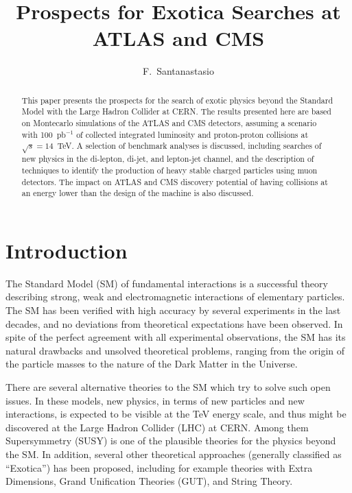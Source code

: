 \documentclass{cimento}
\title{Prospects for Exotica Searches at ATLAS and CMS}
\author{F.~Santanastasio\from{ins:UMD}\ETC
}
\begin{document}
\maketitle

\begin{abstract}
This paper presents the prospects for the search of exotic physics 
beyond the Standard Model with the Large Hadron Collider at CERN. 
The results presented here are based on Montecarlo simulations of the
ATLAS and CMS detectors, assuming a scenario with 
100~pb$^{-1}$ of collected integrated luminosity and proton-proton collisions 
at $\sqrt{s} = 14$~TeV. A selection of benchmark analyses is discussed, 
including searches of new physics in the di-lepton, di-jet, and lepton-jet channel, 
and the description of techniques to identify the production of 
heavy stable charged particles using muon detectors. 
The impact on ATLAS and CMS discovery potential 
of having collisions at an energy lower than the design of the machine 
is also discussed.
\end{abstract}

\section{Introduction}
The Standard Model (SM) of fundamental interactions is a successful theory 
describing strong, weak and electromagnetic interactions of elementary 
particles. The SM has been verified with high accuracy by several experiments 
in the last decades, and no deviations from theoretical expectations 
have been observed. In spite of the perfect agreement with all experimental 
observations, the SM has its natural drawbacks and unsolved theoretical 
problems, ranging from the origin of the particle masses to the nature of the 
Dark Matter in the Universe.

There are several alternative theories to the SM which try to solve such 
open issues. In these models, new physics, in terms of new particles and 
new interactions, is expected to be visible at the TeV energy scale, and 
thus might be discovered at the Large Hadron Collider (LHC) at CERN.
Among them Supersymmetry (SUSY) is one of the plausible theories for the physics 
beyond the SM. In addition, several other theoretical approaches 
(generally classified as ``Exotica'') has been proposed, 
including for example theories with Extra Dimensions, 
Grand Unification Theories (GUT), and String Theory. 
\end{document}
